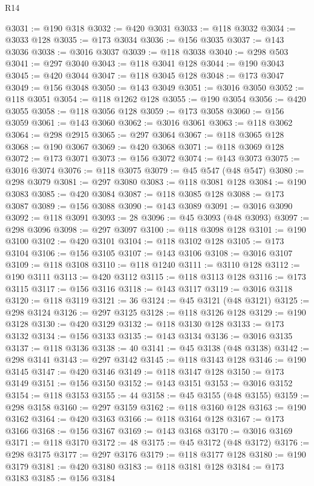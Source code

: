 \begin{lexlean}{R14}
\begin{coremodule}
{{{{{{{{{{{{{{{{{{{{{{{{{{{{{{{{{{{{{{{{{{{{{{{{{{{{{{{{{{{{{{{{{{{{{{{{{{{{{{{{{{@3031 := @190 @318
@3032 := @420 @3031
@3033 := @118 @3032
@3034 := @3033 @128
@3035 := @173 @3034
@3036 := @156 @3035
@3037 := @143 @3036
@3038 := @3016 @3037
@3039 := @118 @3038
@3040 := @298 @503
@3041 := @297 @3040
@3043 := @118 @3041 @128
@3044 := @190 @3043
@3045 := @420 @3044
@3047 := @118 @3045 @128
@3048 := @173 @3047
@3049 := @156 @3048
@3050 := @143 @3049
@3051 := @3016 @3050
@3052 := @118 @3051
@3054 := @118 @1262 @128
@3055 := @190 @3054
@3056 := @420 @3055
@3058 := @118 @3056 @128
@3059 := @173 @3058
@3060 := @156 @3059
@3061 := @143 @3060
@3062 := @3016 @3061
@3063 := @118 @3062
@3064 := @298 @2915
@3065 := @297 @3064
@3067 := @118 @3065 @128
@3068 := @190 @3067
@3069 := @420 @3068
@3071 := @118 @3069 @128
@3072 := @173 @3071
@3073 := @156 @3072
@3074 := @143 @3073
@3075 := @3016 @3074
@3076 := @118 @3075
@3079 := @45 @547 (@48 @547)
@3080 := @298 @3079
@3081 := @297 @3080
@3083 := @118 @3081 @128
@3084 := @190 @3083
@3085 := @420 @3084
@3087 := @118 @3085 @128
@3088 := @173 @3087
@3089 := @156 @3088
@3090 := @143 @3089
@3091 := @3016 @3090
@3092 := @118 @3091
@3093 := 28
@3096 := @45 @3093 (@48 @3093)
@3097 := @298 @3096
@3098 := @297 @3097
@3100 := @118 @3098 @128
@3101 := @190 @3100
@3102 := @420 @3101
@3104 := @118 @3102 @128
@3105 := @173 @3104
@3106 := @156 @3105
@3107 := @143 @3106
@3108 := @3016 @3107
@3109 := @118 @3108
@3110 := @118 @1240
@3111 := @3110 @128
@3112 := @190 @3111
@3113 := @420 @3112
@3115 := @118 @3113 @128
@3116 := @173 @3115
@3117 := @156 @3116
@3118 := @143 @3117
@3119 := @3016 @3118
@3120 := @118 @3119
@3121 := 36
@3124 := @45 @3121 (@48 @3121)
@3125 := @298 @3124
@3126 := @297 @3125
@3128 := @118 @3126 @128
@3129 := @190 @3128
@3130 := @420 @3129
@3132 := @118 @3130 @128
@3133 := @173 @3132
@3134 := @156 @3133
@3135 := @143 @3134
@3136 := @3016 @3135
@3137 := @118 @3136
@3138 := 40
@3141 := @45 @3138 (@48 @3138)
@3142 := @298 @3141
@3143 := @297 @3142
@3145 := @118 @3143 @128
@3146 := @190 @3145
@3147 := @420 @3146
@3149 := @118 @3147 @128
@3150 := @173 @3149
@3151 := @156 @3150
@3152 := @143 @3151
@3153 := @3016 @3152
@3154 := @118 @3153
@3155 := 44
@3158 := @45 @3155 (@48 @3155)
@3159 := @298 @3158
@3160 := @297 @3159
@3162 := @118 @3160 @128
@3163 := @190 @3162
@3164 := @420 @3163
@3166 := @118 @3164 @128
@3167 := @173 @3166
@3168 := @156 @3167
@3169 := @143 @3168
@3170 := @3016 @3169
@3171 := @118 @3170
@3172 := 48
@3175 := @45 @3172 (@48 @3172)
@3176 := @298 @3175
@3177 := @297 @3176
@3179 := @118 @3177 @128
@3180 := @190 @3179
@3181 := @420 @3180
@3183 := @118 @3181 @128
@3184 := @173 @3183
@3185 := @156 @3184
}}}}}}}}}}}}}}}}}}}}}}}}}}}}}}}}}}}}}}}}}}}}}}}}}}}}}}}}}}}}}}}}}}}}}}}}}}}}}}}}}}
\end{coremodule}
\end{lexlean}
